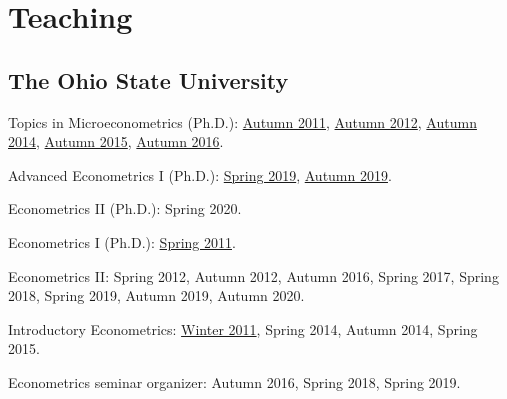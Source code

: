 \documentclass[10pt,letterpaper]{article}
\renewenvironment{itemize}{
  \begin{list}{}{
      \setlength{\leftmargin}{1.5em}
      \setlength{\itemsep}{0.25em}
      \setlength{\parskip}{0pt}
      \setlength{\parsep}{0.25em}
    }
}{
  \end{list}
}
\begin{document}
\section*{Teaching}

\subsection*{The Ohio State University}

\begin{itemize}
\item Topics in Microeconometrics (Ph.D.):
  \href{https://jblevins.org/courses/econ843f11/}{Autumn 2011}, %
  \href{https://jblevins.org/courses/econ8833f12/}{Autumn 2012}, %
  \href{https://jblevins.org/courses/econ8833f14/}{Autumn 2014}, %
  \href{https://jblevins.org/courses/econ8833f15/}{Autumn 2015}, %
  \href{https://jblevins.org/courses/econ8833f16/}{Autumn 2016}. %
\item Advanced Econometrics I (Ph.D.):
  \href{https://jblevins.org/courses/econ8830s19/}{Spring 2019}, %
  \href{https://jblevins.org/courses/econ8830f19/}{Autumn 2019}. %
\item Econometrics II (Ph.D.):
  Spring 2020. %
\item Econometrics I (Ph.D.):
  \href{https://jblevins.org/courses/econ741s11/}{Spring 2011}. %
\item Econometrics II:
  Spring 2012, %
  Autumn 2012, %
  Autumn 2016, %
  Spring 2017, %
  Spring 2018, %
  Spring 2019, %
  Autumn 2019, %
  Autumn 2020. %
\item Introductory Econometrics:
  \href{https://jblevins.org/courses/econ444w11/}{Winter 2011}, %
  Spring 2014, %
  Autumn 2014, %
  Spring 2015. %
\item Econometrics seminar organizer:
  Autumn 2016, Spring 2018, Spring 2019.
\end{itemize}
\end{document}
